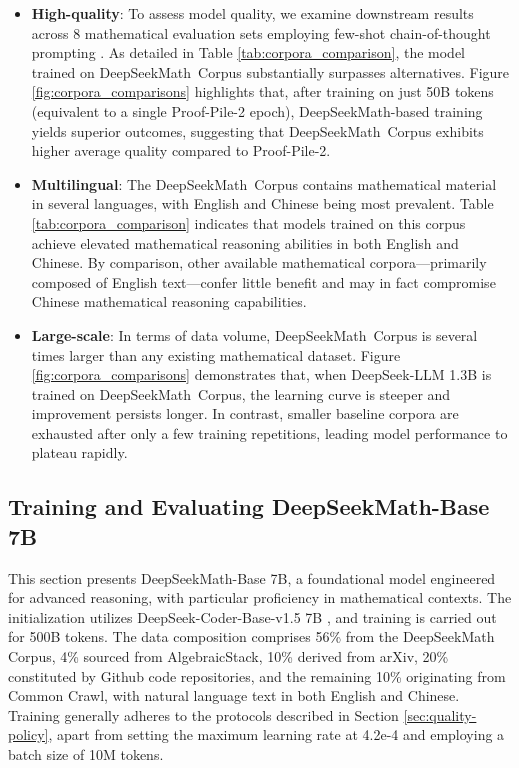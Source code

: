 \begin{itemize}[topsep=0pt]
\begin{itemize}[topsep=0pt]
    \item \textbf{High-quality}:
    To assess model quality, we examine downstream results across 8 mathematical evaluation sets employing few-shot chain-of-thought prompting \cite{cot}. As detailed in Table \ref{tab:corpora_comparison}, the model trained on DeepSeekMath~Corpus substantially surpasses alternatives. Figure \ref{fig:corpora_comparisons} highlights that, after training on just 50B tokens (equivalent to a single Proof-Pile-2 epoch), DeepSeekMath-based training yields superior outcomes, suggesting that DeepSeekMath~Corpus exhibits higher average quality compared to Proof-Pile-2.
    \item \textbf{Multilingual}:
    The DeepSeekMath~Corpus contains mathematical material in several languages, with English and Chinese being most prevalent. Table \ref{tab:corpora_comparison} indicates that models trained on this corpus achieve elevated mathematical reasoning abilities in both English and Chinese. By comparison, other available mathematical corpora—primarily composed of English text—confer little benefit and may in fact compromise Chinese mathematical reasoning capabilities.
    \item \textbf{Large-scale}:
    In terms of data volume, DeepSeekMath~Corpus is several times larger than any existing mathematical dataset. Figure \ref{fig:corpora_comparisons} demonstrates that, when DeepSeek-LLM 1.3B is trained on DeepSeekMath~Corpus, the learning curve is steeper and improvement persists longer. In contrast, smaller baseline corpora are exhausted after only a few training repetitions, leading model performance to plateau rapidly.
\end{itemize}

\subsection{Training and Evaluating DeepSeekMath-Base 7B}

This section presents DeepSeekMath-Base 7B, a foundational model engineered for advanced reasoning, with particular proficiency in mathematical contexts. The initialization utilizes DeepSeek-Coder-Base-v1.5 7B \citep{deepseek-coder}, and training is carried out for 500B tokens. The data composition comprises 56\% from the DeepSeekMath Corpus, 4\% sourced from AlgebraicStack, 10\% derived from arXiv, 20\% constituted by Github code repositories, and the remaining 10\% originating from Common Crawl, with natural language text in both English and Chinese. Training generally adheres to the protocols described in Section \ref{sec:quality-policy}, apart from setting the maximum learning rate at 4.2e-4 and employing a batch size of 10M tokens.


\end{itemize}
